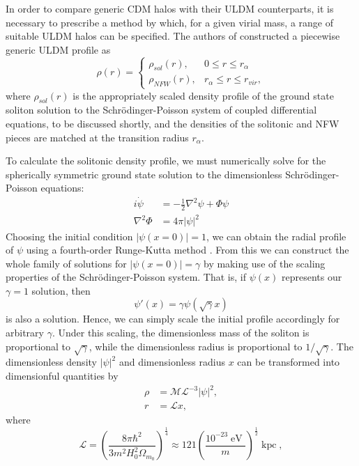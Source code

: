 \documentclass[a4paper,11pt]{article}
\begin{document}
In order to compare generic CDM halos with their ULDM counterparts, it is necessary to prescribe a method by which, for a given virial mass, a range of suitable ULDM halos can be specified. The authors of \cite{Bullock} constructed a piecewise generic ULDM profile as
\begin{equation}\label{eq:piecewise}
     \rho(r)=
    \begin{cases}
      \rho_{sol}(r), & 0\leq r \leq r_{\alpha} \\
      \rho_{NFW}(r), & r_{\alpha}\leq r \leq r_{vir},
    \end{cases}
\end{equation}
where $\rho_{sol}(r)$ is the appropriately scaled density profile of the ground state soliton solution to the Schr{\"o}dinger-Poisson system of coupled differential equations, to be discussed shortly, and the densities of the solitonic and NFW pieces are matched at the transition radius $r_{\alpha}$.

To calculate the solitonic density profile, we must numerically solve for the spherically symmetric ground state solution to the dimensionless Schr{\"o}dinger-Poisson equations:
\begin{align}
    i\dot{\psi} &= -\frac{1}{2}\nabla^2\psi+\Phi\psi \\
    \nabla^2\Phi &= 4\pi \vert \psi\vert^2
\end{align}
Choosing the initial condition $\vert\psi(x=0)\vert = 1$, we can obtain the radial profile of $\psi$ using a fourth-order Runge-Kutta method \cite{Edwards:2018ccc}. From this we can construct the whole family of solutions for $\vert\psi(x=0)\vert = \gamma$ by making use of the scaling properties of the Schr{\"o}dinger-Poisson system. That is, if $\psi(x)$ represents our $\gamma = 1$ solution, then
\begin{equation}
    \psi'(x) = \gamma\psi(\sqrt{\gamma}x)
\end{equation}
is also a solution. Hence, we can simply scale the initial profile accordingly for arbitrary $\gamma$. Under this scaling, the dimensionless mass of the soliton is proportional to $\sqrt{\gamma}$, while the dimensionless radius is proportional to $1/\sqrt{\gamma}$. The dimensionless density $\vert\psi\vert^2$ and dimensionless radius $x$ can be transformed into dimensionful quantities by
\begin{align}
    \rho &= \mathcal{M}\mathcal{L}^{-3}\vert\psi\vert^2, \label{eq:density_conv} \\
    r &= \mathcal{L}x, \label{eq:mass_conv}
\end{align}
where
\begin{equation}\label{eq:length}
    \mathcal{L}=\left(\frac{8\pi\hbar^2}{3 m^2H_0^2\Omega_{m_0}}\right)^{\frac{1}{4}}\approx121\left(\frac{10^{-23}\operatorname{eV}}{m}\right)^{\frac{1}{2}}\operatorname{kpc},\label{eq:length}
\end{equation}
\end{document}
